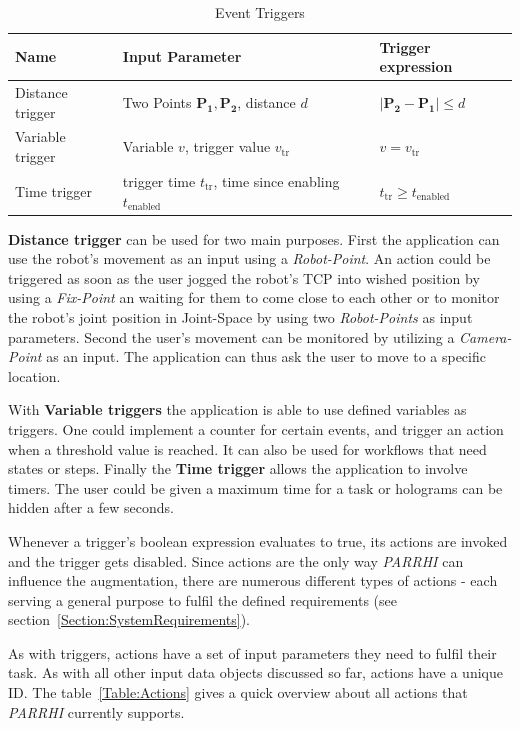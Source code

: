  
 \begin{table}
 	\caption{Event Triggers}
 	\label{Table:Triggers}
 	\centering
 	\begin{tabular}{lll}
 		\toprule
 		Name & Input Parameter		& Trigger expression	\\		
 		\midrule
 		Distance trigger & Two Points $\boldsymbol{P_1}, \boldsymbol{P_2}$, distance $d$		&  $|\boldsymbol{P_2}-\boldsymbol{P_1}| \le d$ \\
		Variable trigger & Variable $v$, trigger value $v_{\text{tr}}$ 		& $v = v_{\text{tr}}$	 \\
		Time trigger & trigger time $t_{\text{tr}}$, time since enabling $t_{\text{enabled}}$ & $t_{\text{tr}} \geq t_{\text{enabled}}$\\
		\bottomrule
	\end{tabular}
\end{table}

\textbf{Distance trigger} can be used for two main purposes. First the application can use the robot's movement as an input using a \textit{Robot-Point}. An action could be triggered as soon as the user jogged the robot's TCP into wished position by using a \textit{Fix-Point} an waiting for them to come close to each other or to monitor the robot's joint position in Joint-Space by using two \textit{Robot-Points} as input parameters. Second the user's movement can be monitored by utilizing a \textit{Camera-Point} as an input. The application can thus ask the user to move to a specific location.

With \textbf{Variable triggers} the application is able to use defined variables as triggers. One could implement a counter for certain events, and trigger an action when a threshold value is reached. It can also be used for workflows that need states or steps. Finally the \textbf{Time trigger} allows the application to involve timers. The user could be given a maximum time for a task or holograms can be hidden after a few seconds.

Whenever a trigger's boolean expression evaluates to true, its actions are invoked and the trigger gets disabled. Since actions are the only way \textit{PARRHI} can influence the augmentation, there are numerous different types of actions - each serving a general purpose to fulfil the defined requirements (see section~\ref{Section:SystemRequirements}).

As with triggers, actions have a set of input parameters they need to fulfil their task. As with all other input data objects discussed so far, actions have a unique ID. The table~\ref{Table:Actions} gives a quick overview about all actions that \textit{PARRHI} currently supports.

